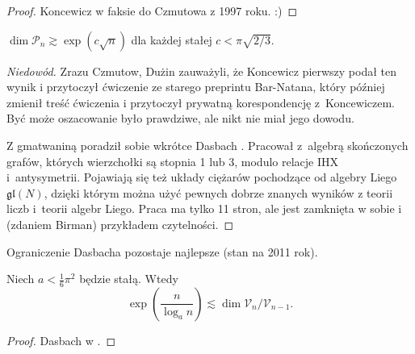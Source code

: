 \begin{proof}
%
%
    Koncewicz w faksie do Czmutowa z 1997 roku. :)
\end{proof}

\begin{proposition}
    $\dim \mathcal P_n \gtrsim \exp (c \sqrt{n})$ dla każdej stałej $c < \pi \sqrt{2/3}$.
\end{proposition}

\begin{proof}[Niedowód]
    Zrazu Czmutow, Dużin \cite[s. 202]{duzhin99} zauważyli, że Koncewicz pierwszy podał  ten wynik i przytoczył ćwiczenie ze starego preprintu Bar-Natana, który później zmienił treść ćwiczenia i przytoczył prywatną korespondencję z~Koncewiczem.
    Być może oszacowanie było prawdziwe, ale nikt nie miał jego dowodu.
    
    Z gmatwaniną poradził sobie wkrótce Dasbach  \cite{dasbach00}.
    Pracował z~algebrą skończonych grafów, których wierzchołki są stopnia 1 lub 3, modulo relacje IHX i~antysymetrii.
    Pojawiają się też układy ciężarów pochodzące od algebry Liego $\mathfrak{gl}(N)$, dzięki którym można użyć pewnych dobrze znanych wyników z teorii liczb i~teorii algebr Liego.
    Praca \cite{dasbach00} ma tylko 11 stron, ale jest zamknięta w sobie i (zdaniem Birman) przykładem czytelności.
\end{proof}

Ograniczenie Dasbacha pozostaje najlepsze (stan na 2011 rok).

\begin{corollary}
    Niech $a < \frac 1 6 \pi^2$ będzie stałą.
    Wtedy
    \begin{equation}
        \exp \left(\frac {n}{\log_a n} \right) \lesssim \dim \mathcal V_n / \mathcal V_{n-1}.
    \end{equation}
\end{corollary}

\begin{proof}
%
    Dasbach w \cite{dasbach00}.
\end{proof}

